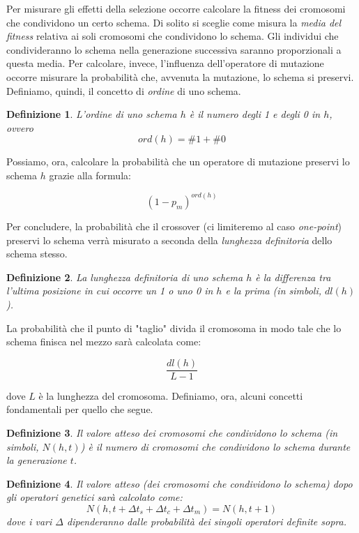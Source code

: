 \documentclass[10pt,a4paper]{article}
\newtheorem{definition}{Definizione}
\begin{document}
Per misurare gli effetti della selezione occorre calcolare la fitness dei cromosomi che condividono un certo schema. Di solito si sceglie come misura la \emph{media del fitness} relativa ai soli cromosomi che condividono lo schema. Gli individui che condivideranno lo schema nella generazione successiva saranno proporzionali a questa media. Per calcolare, invece, l'influenza dell'operatore di mutazione occorre misurare la probabilità che, avvenuta la mutazione, lo schema si preservi. Definiamo, quindi, il concetto di \emph{ordine} di uno schema.

\begin{definition}
L'\emph{ordine} di uno schema $h$ è il numero degli 1 e degli 0 in $h$, ovvero 
$$
ord(h) = \#1 + \#0
$$
\end{definition}

Possiamo, ora, calcolare la probabilità che un operatore di mutazione preservi lo schema $h$ grazie alla formula:

$$
(1 - p_m)^{ord(h)}
$$

Per concludere, la probabilità che il crossover (ci limiteremo al caso \emph{one-point}) preservi lo schema verrà misurato a seconda della \emph{lunghezza definitoria} dello schema stesso.

\begin{definition}
La \emph{lunghezza definitoria} di uno schema $h$ è la differenza tra l'ultima posizione in cui occorre un 1 o uno 0 in $h$ e la prima (in simboli, $dl(h)$).
\end{definition}

La probabilità che il punto di "taglio" divida il cromosoma in modo tale che lo schema finisca nel mezzo sarà calcolata come:

$$
\frac{dl(h)}{L-1}
$$

dove $L$ è la lunghezza del cromosoma. Definiamo, ora, alcuni concetti fondamentali per quello che segue.

\begin{definition}
Il \emph{valore atteso dei cromosomi che condividono lo schema} (in simboli, $N(h,t)$) è il numero di cromosomi che condividono lo schema durante la generazione $t$.
\end{definition}

\begin{definition}
Il \emph{valore atteso (dei cromosomi che condividono lo schema) dopo gli operatori genetici} sarà calcolato come:
$$
N(h,t + \Delta t_s + \Delta t_c + \Delta t_m) = N(h,t+1)
$$
dove i vari $\Delta$ dipenderanno dalle probabilità dei singoli operatori definite sopra.
\end{definition}
\end{document}
